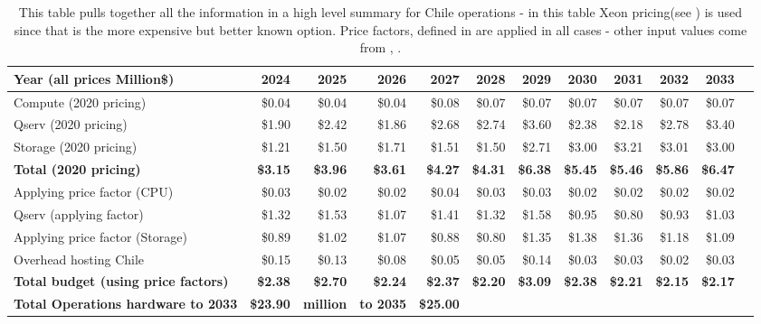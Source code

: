 \tiny \begin{longtable} { |p{}  |r  |r  |r  |r  |r  |r  |r  |r  |r  |r  |r |} 
\caption{This table pulls together all the information in a high level summary for Chile operations - in this table Xeon pricing(see ) is used since that is the more expensive but better known option. Price factors, defined in  are applied in all cases - other input values come from , .
 \label{tab:opsSumChile}}\\ 
\hline 
\textbf{Year  (all prices Million\$)}&\textbf{2024}&\textbf{2025}&\textbf{2026}&\textbf{2027}&\textbf{2028}&\textbf{2029}&\textbf{2030}&\textbf{2031}&\textbf{2032}&\textbf{2033} \\ \hline
{Compute (2020 pricing)}&{\$0.04}&{\$0.04}&{\$0.04}&{\$0.08}&{\$0.07}&{\$0.07}&{\$0.07}&{\$0.07}&{\$0.07}&{\$0.07} \\ \hline
{Qserv (2020 pricing)}&{\$1.90}&{\$2.42}&{\$1.86}&{\$2.68}&{\$2.74}&{\$3.60}&{\$2.38}&{\$2.18}&{\$2.78}&{\$3.40} \\ \hline
{Storage (2020 pricing)}&{\$1.21}&{\$1.50}&{\$1.71}&{\$1.51}&{\$1.50}&{\$2.71}&{\$3.00}&{\$3.21}&{\$3.01}&{\$3.00} \\ \hline
\textbf{Total (2020 pricing)}&\textbf{\$3.15}&\textbf{\$3.96}&\textbf{\$3.61}&\textbf{\$4.27}&\textbf{\$4.31}&\textbf{\$6.38}&\textbf{\$5.45}&\textbf{\$5.46}&\textbf{\$5.86}&\textbf{\$6.47} \\ \hline
{Applying price factor (CPU)}&{\$0.03}&{\$0.02}&{\$0.02}&{\$0.04}&{\$0.03}&{\$0.03}&{\$0.02}&{\$0.02}&{\$0.02}&{\$0.02} \\ \hline
{Qserv (applying factor)}&{\$1.32}&{\$1.53}&{\$1.07}&{\$1.41}&{\$1.32}&{\$1.58}&{\$0.95}&{\$0.80}&{\$0.93}&{\$1.03} \\ \hline
{Applying price factor (Storage)}&{\$0.89}&{\$1.02}&{\$1.07}&{\$0.88}&{\$0.80}&{\$1.35}&{\$1.38}&{\$1.36}&{\$1.18}&{\$1.09} \\ \hline
{Overhead hosting Chile}&{\$0.15}&{\$0.13}&{\$0.08}&{\$0.05}&{\$0.05}&{\$0.14}&{\$0.03}&{\$0.03}&{\$0.02}&{\$0.03} \\ \hline
\textbf{Total budget (using price factors)}&\textbf{\$2.38}&\textbf{\$2.70}&\textbf{\$2.24}&\textbf{\$2.37}&\textbf{\$2.20}&\textbf{\$3.09}&\textbf{\$2.38}&\textbf{\$2.21}&\textbf{\$2.15}&\textbf{\$2.17} \\ \hline
\textbf{Total Operations hardware to 2033}&\textbf{\$23.90}&\textbf{million}&\textbf{to 2035}&\textbf{\$25.00}&&&&&& \\ \hline
\end{longtable} \normalsize
